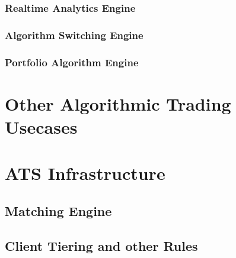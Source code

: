 \subsubsection{Realtime Analytics Engine}
\subsubsection{Algorithm Switching Engine}
\subsubsection{Portfolio Algorithm Engine}

\section{Other Algorithmic Trading Usecases}


\section{ATS Infrastructure}
\subsection{Matching Engine}
\subsection{Client Tiering and other Rules}

